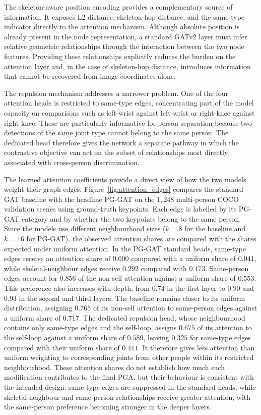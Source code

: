 The skeleton-aware position encoding provides a complementary source of
information.
It exposes L2 distance,
skeleton-hop distance,
and the same-type indicator directly to the attention mechanism.
Although absolute position is already present in the node representation,
a standard GATv2 layer must infer relative geometric relationships
through the interaction between the two node features.
Providing these relationships explicitly reduces the burden on the
attention layer and,
in the case of skeleton-hop distance,
introduces information that cannot be recovered from image coordinates
alone.

The repulsion mechanism addresses a narrower problem.
One of the four attention heads is restricted to same-type edges,
concentrating part of the model capacity on comparisons such as
left-wrist against left-wrist or right-knee against right-knee.
These are particularly informative for person separation because two
detections of the same joint type cannot belong to the same person.
The dedicated head therefore gives the network a separate pathway
in which the contrastive objective can act on the subset of
relationships most directly associated with cross-person discrimination.

The learned attention coefficients provide a direct view of how the two models
weight their graph edges. Figure~\ref{fig:attention_edges} compares
the standard GAT baseline with the headline PG-GAT on the $1{,}248$ multi-person
COCO validation scenes using ground-truth keypoints. Each edge is labelled by its PG-GAT
category and by whether the two keypoints belong to the same person. Since the models
use different neighbourhood sizes ($k=8$ for the baseline and $k=16$ for PG-GAT), the observed attention
shares are compared with the shares expected under uniform attention. In the PG-GAT standard heads,
same-type edges receive an attention share of $0.000$
compared with a uniform share of $0.041$, while skeletal-neighbour edges receive
$0.292$ compared with $0.173$. Same-person edges account for $0.856$ of the non-self
attention against a uniform share of $0.553$. This preference also increases with depth,
from $0.74$ in the first layer to $0.90$ and $0.93$ in the second and third layers. The baseline
remains closer to its uniform distribution, assigning $0.765$ of its non-self attention to same-person
edges against a uniform share of $0.717$. The dedicated repulsion head, whose
neighbourhood contains only same-type edges and the self-loop, assigns $0.675$ of its attention
to the self-loop against a uniform share of $0.589$, leaving $0.325$ for same-type edges
compared with their uniform share of $0.411$. It therefore gives
less attention than uniform weighting to corresponding joints from other people within its
restricted neighbourhood. These attention shares do not establish how much each modification contributes
to the final PGA, but their behaviour is consistent with the intended design:
same-type edges are suppressed in the standard heads, while skeletal-neighbour and
same-person relationships receive greater attention, with the same-person preference
becoming stronger in the deeper layers.

